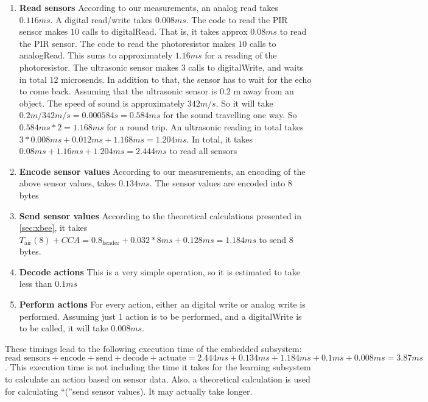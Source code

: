  \begin{enumerate}
  \item \textbf{Read sensors} According to our measurements, an analog read takes $0.116 ms$. A digital read/write takes $0.008 ms$. The code to read the PIR sensor makes $10$ calls to digitalRead. That is, it takes approx $0.08 ms$ to read the PIR sensor. The code to read the photoresistor makes $10$ calls to analogRead. This sums to approximately $1.16 ms$ for a reading of the photoresistor. The ultrasonic sensor makes $3$ calls to digitalWrite, and waits in total $12$ microsends. In addition to that, the sensor has to wait for the echo to come back. Assuming that the ultrasonic sensor is $0.2$ m away from an object. The speed of sound is approximately $342 m/s$. So it will take $0.2 m / 342 m/s = 0.000584 s = 0.584 ms$ for the sound travelling one way. So $0.584 ms * 2 = 1.168 ms$ for a round trip. An ultrasonic reading in total takes $3 * 0.008 ms + 0.012 ms + 1.168 ms = 1.204 ms$. In total, it takes $0.08 ms + 1.16 ms + 1.204 ms = 2.444 ms$ to read all sensors
  \item \textbf{Encode sensor values} According to our measurements, an encoding of the above sensor values, takes $0.134 ms$. The sensor values are encoded into 8 bytes
  \item \textbf{Send sensor values} According to the theoretical calculations presented in \cref{sec:xbee}, it takes $T_{\text{air}}(8) + CCA = 0.8_{\text{header}} + 0.032*8 ms + 0.128 ms = 1.184 ms$ to send 8 bytes.
  \item \textbf{Decode actions} This is a very simple operation, so it is estimated to take less than $0.1 ms$
  \item \textbf{Perform actions} For every action, either an digital write or analog write is performed. Assuming just 1 action is to be performed, and a digitalWrite is to be called, it will take $0.008 ms$.
\end{enumerate}

These timings lead to the following execution time of the embedded subsystem: $\text{read sensors} + \text{encode} + \text{send} + \text{decode} + \text{actuate} = 2.444 ms + 0.134 ms + 1.184 ms + 0.1 ms + 0.008 ms = 3.87 ms$. This execution time is not including the time it takes for the learning subsystem to calculate an action based on sensor data. Also, a theoretical calculation is used for calculating \enquote(send sensor values). It may actually take longer.
